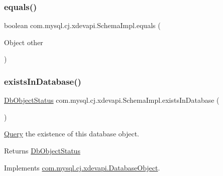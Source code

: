 \subsubsection{\texorpdfstring{equals()}{equals()}}
{\footnotesize\ttfamily boolean com.\+mysql.\+cj.\+xdevapi.\+Schema\+Impl.\+equals (\begin{DoxyParamCaption}\item[{Object}]{other }\end{DoxyParamCaption})}

\mbox{\label{classcom_1_1mysql_1_1cj_1_1xdevapi_1_1_schema_impl_a587cff9708d8d6787ad6012fd0353d5f}} 
\subsubsection{\texorpdfstring{exists\+In\+Database()}{existsInDatabase()}}
{\footnotesize\ttfamily \mbox{\hyperlink{enumcom_1_1mysql_1_1cj_1_1xdevapi_1_1_database_object_1_1_db_object_status}{Db\+Object\+Status}} com.\+mysql.\+cj.\+xdevapi.\+Schema\+Impl.\+exists\+In\+Database (\begin{DoxyParamCaption}{ }\end{DoxyParamCaption})}

\mbox{\hyperlink{interfacecom_1_1mysql_1_1cj_1_1_query}{Query}} the existence of this database object.

\begin{DoxyReturn}{Returns}
\mbox{\hyperlink{}{Db\+Object\+Status}} 
\end{DoxyReturn}


Implements \mbox{\hyperlink{interfacecom_1_1mysql_1_1cj_1_1xdevapi_1_1_database_object_ab4215a82b546a9e1dcb344c339765d7a}{com.\+mysql.\+cj.\+xdevapi.\+Database\+Object}}.

\mbox{\label{classcom_1_1mysql_1_1cj_1_1xdevapi_1_1_schema_impl_abcdaa1e922b045e78ed4748279042ed9}} 
